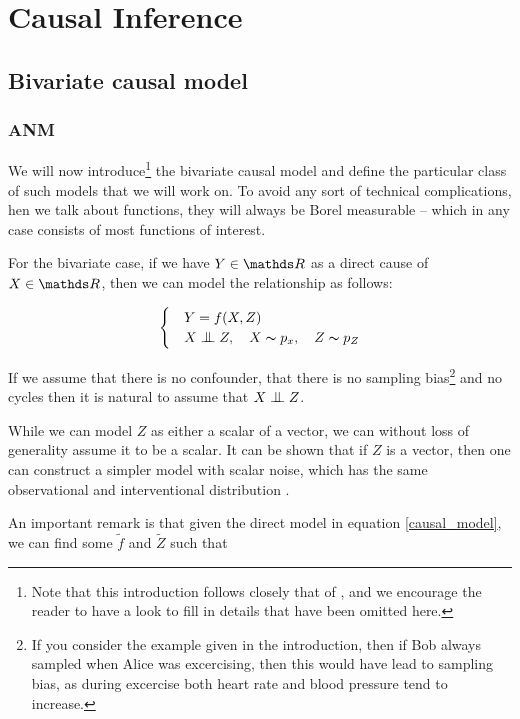 \chapter{Causal Inference}

\section{Bivariate causal model}

\subsection{ANM}

We will now introduce\footnote{Note that this introduction follows closely that of \cite{Mooij2016jmlr}, and 
we encourage the reader to have a look to fill in details that have been omitted here.} 
the bivariate causal model and define the particular class of such models that 
we will work on. To avoid any sort of technical complications, hen we talk about functions, 
they will always be Borel measurable -- which in any case consists of most functions of interest.

For the bivariate case, if we have $Y \in \R$ as a direct cause of $X \in \R$, then we can model 
the relationship as follows:

\begin{equation}
    \begin{cases} 
        & Y = f(X, Z) \\
        & X \bigCI Z,\quad X \thicksim p_x,\quad Z \thicksim p_{Z}  
     \end{cases}
     \label{causal_model}
\end{equation}

If we assume that there is no confounder, that there is no sampling bias\footnote{If you consider the 
example given in the introduction, then if Bob always sampled when Alice was excercising, then this 
would have lead to sampling bias, as during excercise both heart rate and blood pressure tend to increase.} 
and no cycles then it is natural to assume that $X \bigCI Z$.

While we can model $Z$ as either a scalar of a vector, we can without loss of generality assume it to be a scalar.
It can be shown that if $Z$ is a vector, then one can construct a simpler model with scalar noise, which has the 
same observational and interventional distribution \cite{Mooij2016jmlr}.

An important remark is that given the direct model in equation \ref{causal_model}, we can find some 
$\tilde{f}$ and $\tilde{Z}$ such that

